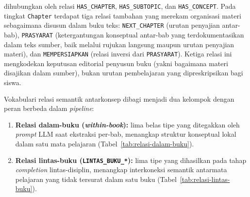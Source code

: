 \documentclass[main]{subfiles}
\begin{document}
\noindent dihubungkan oleh relasi \texttt{HAS\_CHAPTER},
\texttt{HAS\_SUBTOPIC}, dan \texttt{HAS\_CONCEPT}. Pada tingkat
\texttt{Chapter} terdapat tiga relasi tambahan yang merekam
organisasi materi sebagaimana disusun dalam buku teks:
\texttt{NEXT\_CHAPTER} (urutan penyajian antar-bab),
\texttt{PRASYARAT} (ketergantungan konseptual antar-bab yang
terdokumentasikan dalam teks sumber, baik melalui rujukan langsung
maupun urutan penyajian materi), dan \texttt{MEMPERSIAPKAN} (relasi
inversi dari \texttt{PRASYARAT}). Ketiga relasi ini mengkodekan
keputusan editorial penyusun buku (yakni bagaimana materi disajikan
dalam sumber), bukan urutan pembelajaran yang dipreskripsikan
bagi siswa.

Vokabulari relasi semantik antarkonsep dibagi menjadi dua kelompok
dengan peran berbeda dalam \textit{pipeline}:

\begin{enumerate}
  \item \textbf{Relasi dalam-buku (\textit{within-book}):} lima belas tipe
        yang ditegakkan oleh \textit{prompt} LLM saat ekstraksi per-bab,
        menangkap struktur konseptual lokal dalam satu mata pelajaran
        (Tabel~\ref{tab:relasi-dalam-buku}).
  \item \textbf{Relasi lintas-buku (\texttt{LINTAS\_BUKU\_*}):} lima
        tipe yang dihasilkan pada tahap \textit{completion}
        lintas-disiplin, menangkap interkoneksi semantik antarmata
        pelajaran yang tidak tersurat dalam satu buku
        (Tabel~\ref{tab:relasi-lintas-buku}).
\end{enumerate}
\end{document}
